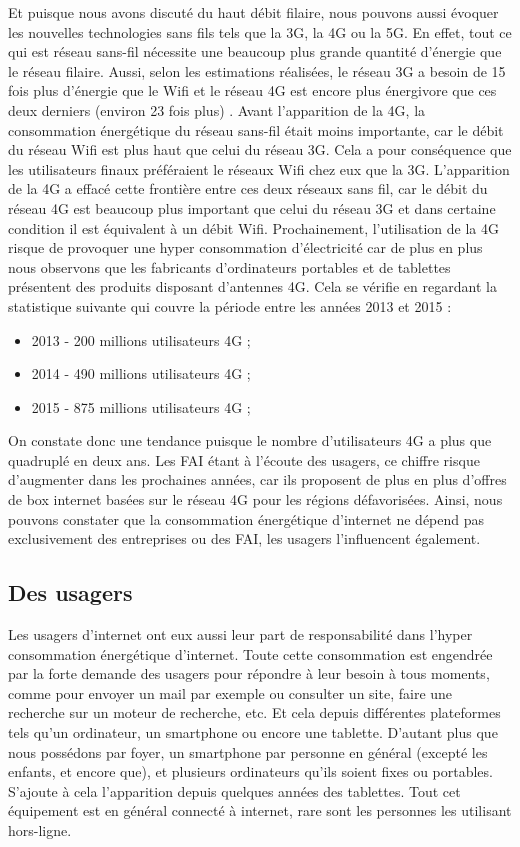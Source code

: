 \documentclass[a4paper,twocolumn,12pt]{article}
\begin{document}
	Et puisque nous avons discuté du haut débit filaire, nous pouvons aussi évoquer les nouvelles technologies sans fils tels que la 3G, la 4G ou la 5G. En effet, tout ce qui est réseau sans-fil nécessite une beaucoup plus grande quantité d'énergie que le réseau filaire. Aussi, selon les estimations réalisées, le réseau 3G a besoin de 15 fois plus d'énergie que le Wifi et le réseau 4G est encore plus énergivore que ces deux derniers (environ 23 fois plus) \cite{4}. Avant l’apparition de la 4G, la consommation énergétique du réseau sans-fil était moins importante, car le débit du réseau Wifi est plus haut que celui du réseau 3G. Cela a pour conséquence que les utilisateurs finaux préféraient le réseaux Wifi chez eux que la 3G. L’apparition de la 4G a effacé cette frontière entre ces deux réseaux sans fil, car le débit  du réseau 4G  est beaucoup plus important que celui du réseau 3G et dans certaine condition il est équivalent à un débit Wifi. Prochainement, l’utilisation de la 4G risque de provoquer une hyper consommation d'électricité car de plus en plus nous observons que les fabricants d'ordinateurs portables et de tablettes présentent des produits disposant d’antennes 4G. Cela se vérifie en regardant la statistique suivante qui couvre la période entre les années 2013 et 2015 \cite{4} :
	
\begin{itemize}	
	\item 2013 - 200 millions utilisateurs 4G ;
	\item 2014 - 490 millions utilisateurs 4G ;
	\item 2015 - 875 millions utilisateurs 4G ;
\end{itemize}

	\indent On constate donc une tendance puisque le nombre d’utilisateurs 4G a plus que quadruplé en deux ans. Les FAI étant à l'écoute des usagers, ce chiffre risque d’augmenter dans les prochaines années, car ils proposent de plus en plus d’offres de box internet basées sur le réseau 4G pour les régions défavorisées. Ainsi, nous pouvons constater que la consommation énergétique d’internet ne dépend pas exclusivement des entreprises ou des FAI, les usagers l’influencent également.


\subsection{Des usagers}
	
	Les usagers d’internet ont eux aussi leur part de responsabilité dans l'hyper consommation énergétique d’internet. Toute cette consommation est engendrée par la forte demande des usagers pour répondre à leur besoin à tous moments, comme pour envoyer un mail par exemple ou consulter un site, faire une recherche sur un moteur de recherche, etc. Et cela depuis différentes plateformes tels qu’un ordinateur, un smartphone ou encore une tablette. D'autant plus que nous possédons par foyer, un smartphone par personne en général (excepté les enfants, et encore que), et plusieurs ordinateurs qu’ils soient fixes ou portables. S’ajoute à cela l’apparition depuis quelques années des tablettes. Tout cet équipement est en général connecté à internet, rare sont les personnes les utilisant hors-ligne. \\
\end{document}
